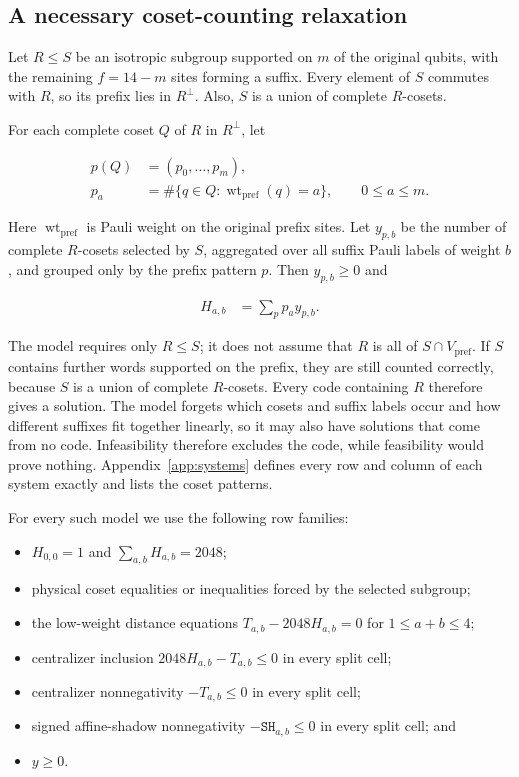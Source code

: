 \documentclass[11pt]{article}
\providecommand{\tightlist}{\setlength{\itemsep}{0pt}\setlength{\parskip}{0pt}}
\begin{document}
\subsection{A necessary coset-counting relaxation}\label{a-necessary-coset-counting-relaxation}

Let \(R \leq S\) be an isotropic subgroup supported on \(m\) of the original qubits, with the remaining \(f=14-m\) sites forming a suffix. Every element of \(S\) commutes with \(R\), so its prefix lies in \(R^\perp\). Also, \(S\) is a union of complete \(R\)-cosets.

For each complete coset \(Q\) of \(R\) in \(R^\perp\), let

\[
\begin{aligned}
p(Q)&=(p_{0},\dots,p_{m}), \\
  p_{a} &=\#\{q \in Q : \operatorname{wt}_{\mathrm{pref}}(q)=a\},\qquad 0\leq a\leq m.
\end{aligned}
\]

Here \(\operatorname{wt}_{\mathrm{pref}}\) is Pauli weight on the original prefix sites.
Let \(y_{p,b}\) be the number of complete \(R\)-cosets selected by \(S\), aggregated over all suffix Pauli labels of weight \(b\), and grouped only by the prefix pattern \(p\). Then \(y_{p,b} \geq 0\) and

\[
\begin{aligned}
H_{a,b} &=\sum_{p} p_{a} y_{p,b}.
\end{aligned}
\]

The model requires only \(R\leq S\); it does not assume that \(R\) is all of \(S\cap V_{\mathrm{pref}}\). If \(S\) contains further words supported on the prefix, they are still counted correctly, because \(S\) is a union of complete \(R\)-cosets. Every code containing \(R\) therefore gives a solution. The model forgets which cosets and suffix labels occur and how different suffixes fit together linearly, so it may also have solutions that come from no code. Infeasibility therefore excludes the code, while feasibility would prove nothing. Appendix~\ref{app:systems} defines every row and column of each system exactly and lists the coset patterns.

For every such model we use the following row families:

\begin{itemize}
\tightlist
\item
  \(H_{0,0}=1\) and \(\sum_{a,b}H_{a,b}=2048\);
\item
  physical coset equalities or inequalities forced by the selected subgroup;
\item
  the low-weight distance equations \(T_{a,b}-2048H_{a,b}=0\) for \(1 \leq a+b \leq 4\);
\item
  centralizer inclusion \(2048H_{a,b}-T_{a,b} \leq 0\) in every split cell;
\item
  centralizer nonnegativity \(-T_{a,b} \leq 0\) in every split cell;
\item
  signed affine-shadow nonnegativity \(-\mathtt{SH}_{a,b} \leq 0\) in every split cell; and
\item
  \(y \geq 0\).
\end{itemize}
\end{document}
